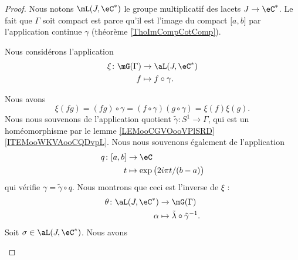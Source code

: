 \begin{proof}
    Nous notons \( \mL(J,\eC^*)\) le groupe multiplicatif des lacets \( J\to \eC^*\). Le fait que \( \Gamma\) soit compact est parce qu'il est l'image du compact \( \mathopen[ a , b \mathclose]\) par l'application continue \( \gamma\) (théorème \ref{ThoImCompCotComp}).

    Nous considérons l'application
    \begin{equation}
        \begin{aligned}
            \xi\colon \mG(\Gamma)&\to \aL(J,\eC^*) \\
            f&\mapsto f\circ \gamma. 
        \end{aligned}
    \end{equation}
    \begin{subproof}
         Nous avons
         \begin{equation}
             \xi(fg)=(fg)\circ \gamma=(f\circ \gamma)(g\circ \gamma)=\xi(f)\xi(g).
         \end{equation}
         Nous nous souvenons de l'application quotient \( \tilde \gamma\colon S^1\to \Gamma\), qui est un homéomorphisme par le lemme \ref{LEMooCGVOooVPlSRD}\ref{ITEMooWKVAooCQDvpL}. Nous nous souvenons également de l'application
         \begin{equation}
             \begin{aligned}
                 q\colon \mathopen[ a , b \mathclose]&\to \eC \\
                 t&\mapsto \exp\big( 2i\pi t/(b-a) \big) 
             \end{aligned}
         \end{equation}
         qui vérifie \( \gamma=\tilde \gamma\circ q\). Nous montrons que ceci est l'inverse de \( \xi\) :
         \begin{equation}
             \begin{aligned}
                 \theta\colon \aL(J,\eC^*)&\to \mG(\Gamma) \\
                 \alpha&\mapsto \tilde \lambda\circ\tilde \gamma^{-1}. 
             \end{aligned}
         \end{equation}
         Soit \( \sigma\in\aL(J,\eC^*)\). Nous avons

\end{subproof}
\end{proof}

